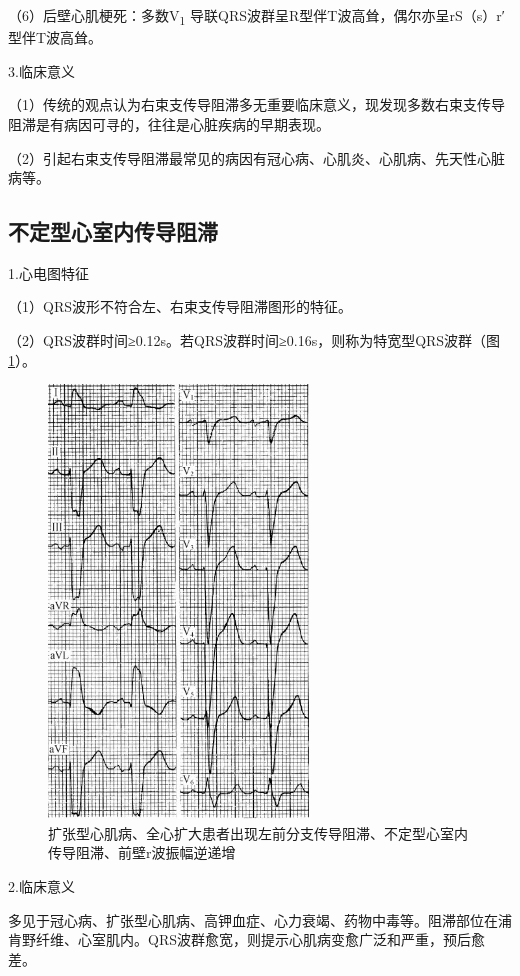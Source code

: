 （6）后壁心肌梗死：多数V\textsubscript{1}
导联QRS波群呈R型伴T波高耸，偶尔亦呈rS（s）r′型伴T波高耸。

3.临床意义

（1）传统的观点认为右束支传导阻滞多无重要临床意义，现发现多数右束支传导阻滞是有病因可寻的，往往是心脏疾病的早期表现。

（2）引起右束支传导阻滞最常见的病因有冠心病、心肌炎、心肌病、先天性心脏病等。

\protect\hypertarget{text00009.htmlux5cux23subid57}{}{}

\subsection{不定型心室内传导阻滞}

1.心电图特征

（1）QRS波形不符合左、右束支传导阻滞图形的特征。

（2）QRS波群时间≥0.12s。若QRS波群时间≥0.16s，则称为特宽型QRS波群（图\ref{fig3-13}）。

\begin{figure}[!htbp]
 \centering
 \includegraphics[width=2.71875in,height=4.53125in]{./images/Image00063.jpg}
 \captionsetup{justification=centering}
 \caption{扩张型心肌病、全心扩大患者出现左前分支传导阻滞、不定型心室内传导阻滞、前壁r波振幅逆递增}
 \label{fig3-13}
  \end{figure} 

2.临床意义

多见于冠心病、扩张型心肌病、高钾血症、心力衰竭、药物中毒等。阻滞部位在浦肯野纤维、心室肌内。QRS波群愈宽，则提示心肌病变愈广泛和严重，预后愈差。

